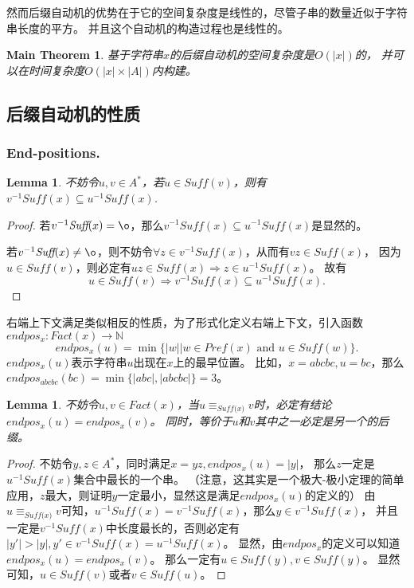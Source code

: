 \documentclass[UTF8]{ctexart}
\newtheorem{lem}[thm]{Lemma}
\newtheorem{mthm}[thm]{Main Theorem}
\theoremstyle{definition}
\theoremstyle{remark}
\numberwithin{equation}{subsection}
\newcommand{\equsuf}[1][x]{\equiv_{\textit{Suff(#1)}}}
\newcommand{\Suff}{\textit{Suff}}
\begin{document}
	然而后缀自动机的优势在于它的空间复杂度是线性的，尽管子串的数量近似于字符串长度的平方。
	并且这个自动机的构造过程也是线性的。
	
	\begin{mthm}
		基于字符串$x$的后缀自动机的空间复杂度是$O(|x|)$的，
		并可以在时间复杂度$O(|x| \times |A|)$内构建。
	\end{mthm}
	
\subsection{后缀自动机的性质}

\subsubsection{End-positions.}
	
	\begin{lem}
	\label{lem:u_in_sufv}
		不妨令$u,v \in A^*$，若$u \in \Suff(v)$，则有$v^{-1} \Suff(x) \subseteq u^{-1} \Suff(x)$.
	\end{lem}
	\begin{proof}
		若$v^{-1} \Suff(x) = {\o}$，那么$v^{-1} \Suff(x) \subseteq u^{-1} \Suff(x)$是显然的。
		
		若$v^{-1} \Suff(x) \neq {\o}$，则不妨令$\forall z \in v^{-1} \Suff(x)$，从而有$vz \in \Suff(x)$，
		因为$u \in \Suff(v)$，则必定有$uz \in \Suff(x) \Rightarrow z \in u^{-1} \Suff(x)$。
		故有
		\[
			u \in \Suff(v) \Rightarrow v^{-1} \Suff(x) \subseteq u^{-1} \Suff(x).
		\]
	\end{proof}
	
	右端上下文满足类似相反的性质，为了形式化定义右端上下文，引入函数$endpos_x: Fact(x) \rightarrow \mathbb{N}$
	\[
		endpos_x(u) = \min \{ |w| | w \in Pref(x) \text{ and } u \in \Suff(w) \}.
	\]
	$endpos_x(u)$表示字符串$u$出现在$x$上的最早位置。
	比如，$x = abcbc, u=bc$，那么$endpos_{abcbc}(bc) = \min \{ |abc|, |abcbc| \} = 3$。
	
	\begin{lem}
	\label{lem:u_equsuf_v}
		不妨令$u,v \in Fact(x)$，当$u \equsuf v$时，必定有结论$endpos_x(u) = endpos_x(v)$。
		同时，等价于$u$和$v$其中之一必定是另一个的后缀。
	\end{lem}
	\begin{proof}
		不妨令$y,z \in A^*$，同时满足$x = yz, endpos_x(u) = |y|$，
		那么$z$一定是$u^{-1} \Suff(x)$集合中最长的一个串。
		（注意，这其实是一个极大-极小定理的简单应用，$z$最大，则证明$y$一定最小，显然这是满足$endpos_x(u)$的定义的）
		由$u \equsuf v$可知，$u^{-1} \Suff(x) = v^{-1} \Suff(x)$，那么$y \in v^{-1} \Suff(x)$，
		并且一定是$v^{-1} \Suff(x)$中长度最长的，否则必定有$|y'| > |y|, y' \in v^{-1} \Suff(x) = u^{-1} \Suff(x)$。
		显然，由$endpos_x$的定义可以知道$endpos_x(u) = endpos_x(v)$。
		那么一定有$u \in \Suff(y), v \in \Suff(y)$。
		显然可知，$u \in \Suff(v)$或者$v \in \Suff(u)$。
	\end{proof}
	
\end{document}
